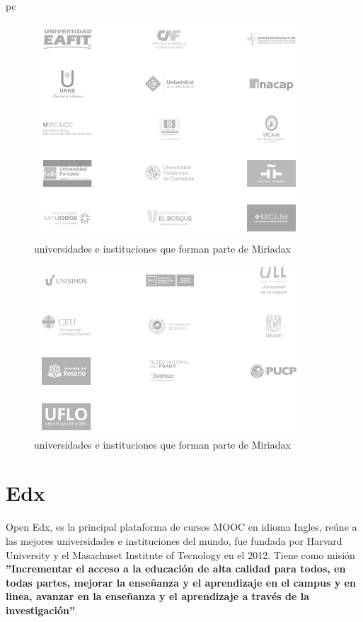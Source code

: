 pc\documentclass[a4paper,12pt,openany]{book}
\begin{document}
\begin{figure}[ht]
  \centering
	\includegraphics[width=10cm]{miriada10-5.png}
\caption{universidades e instituciones que forman parte de Miriadax}
  \label{fig:miriada10-5}
\end{figure}

\begin{figure}[ht]
  \centering
	\includegraphics[width=10cm]{miriada10-6.png}
\caption{universidades e instituciones que forman parte de Miriadax}
  \label{fig:miriada10-6}
\end{figure}

\clearpage
\section{Edx}

Open Edx, es la principal plataforma de cursos MOOC en idioma Ingles, reúne a las mejores universidades e instituciones del mundo, fue fundada por Harvard University y el Masachuset Institute of Tecnology en el 2012. Tiene como misión \textbf{''Incrementar el acceso a la educación de alta calidad para todos, en todas partes, mejorar la enseñanza y el aprendizaje en el campus y en linea, avanzar en la enseñanza y el aprendizaje a través de la investigación''}.  
\end{document}
